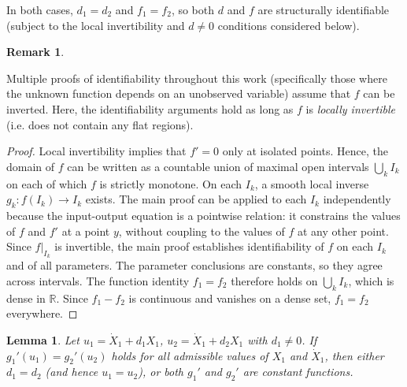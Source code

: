 \documentclass{article}
\theoremstyle{plain}
\newtheorem{lemma}{Lemma}[section]
\theoremstyle{definition}
\newtheorem{remark}{Remark}[section]
\begin{document}
{\medskip\noindent
In both cases, $d_1 = d_2$ and $f_1 = f_2$, so both $d$ and $f$ are structurally identifiable (subject to the local invertibility and $d \neq 0$ conditions considered below).

\begin{remark} \label{remark:proof_invertibility}

Multiple proofs of identifiability throughout this work (specifically those where the unknown function depends on an unobserved variable) assume that $f$ can be inverted. Here, the identifiability arguments hold as long as $f$ is \emph{locally invertible} (i.e. does not contain any flat regions).
\begin{proof}
Local invertibility implies that $f' = 0$ only at isolated points. Hence, the domain of $f$ can be written as a countable union of maximal open intervals $\bigcup_k I_k$ on each of which $f$ is strictly monotone. On each $I_k$, a smooth local inverse $g_k\colon f(I_k) \to I_k$ exists. The main proof can be applied to each $I_k$ independently because the input-output equation is a pointwise relation: it constrains the values of $f$ and $f'$ at a point $y$, without coupling to the values of $f$ at any other point. Since $f|_{I_k}$ is invertible, the main proof establishes identifiability of $f$ on each $I_k$ and of all parameters. The parameter conclusions are constants, so they agree across intervals. The function identity $f_1 = f_2$ therefore holds on $\bigcup_k I_k$, which is dense in $\mathbb{R}$. Since $f_1 - f_2$ is continuous and vanishes on a dense set, $f_1 = f_2$ everywhere.
\end{proof}
\end{remark}

\begin{lemma} \label{lemma:g_prime_equality}
Let $u_1 = \dot{X}_1 + d_1 X_1$, $u_2 = \dot{X}_1 + d_2 X_1$ with $d_1 \neq 0$. If $g_1'(u_1) = g_2'(u_2)$ holds for all admissible values of $X_1$ and $\dot{X}_1$, then either $d_1 = d_2$ (and hence $u_1 = u_2$), or both $g_1'$ and $g_2'$ are constant functions.
\end{lemma}

}
\end{document}
